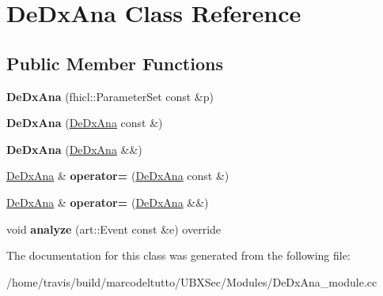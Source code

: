 \hypertarget{classDeDxAna}{\section{\-De\-Dx\-Ana \-Class \-Reference}
\label{classDeDxAna}
}
\subsection*{\-Public \-Member \-Functions}
\begin{DoxyCompactItemize}
\item 
\hypertarget{classDeDxAna_aafa017bdd99fff476da1a0fc5ea67722}{{\bfseries \-De\-Dx\-Ana} (fhicl\-::\-Parameter\-Set const \&p)}\label{classDeDxAna_aafa017bdd99fff476da1a0fc5ea67722}

\item 
\hypertarget{classDeDxAna_ae7e0a9f6e1db3755e4654823b34fcde4}{{\bfseries \-De\-Dx\-Ana} (\hyperlink{classDeDxAna}{\-De\-Dx\-Ana} const \&)}\label{classDeDxAna_ae7e0a9f6e1db3755e4654823b34fcde4}

\item 
\hypertarget{classDeDxAna_aad15dd4536f28285b7c09a592bf7754f}{{\bfseries \-De\-Dx\-Ana} (\hyperlink{classDeDxAna}{\-De\-Dx\-Ana} \&\&)}\label{classDeDxAna_aad15dd4536f28285b7c09a592bf7754f}

\item 
\hypertarget{classDeDxAna_a9742e2fc78c3b77f1bc7bf275913cf0a}{\hyperlink{classDeDxAna}{\-De\-Dx\-Ana} \& {\bfseries operator=} (\hyperlink{classDeDxAna}{\-De\-Dx\-Ana} const \&)}\label{classDeDxAna_a9742e2fc78c3b77f1bc7bf275913cf0a}

\item 
\hypertarget{classDeDxAna_acfafa21db320eff1ed8bf4acd021991c}{\hyperlink{classDeDxAna}{\-De\-Dx\-Ana} \& {\bfseries operator=} (\hyperlink{classDeDxAna}{\-De\-Dx\-Ana} \&\&)}\label{classDeDxAna_acfafa21db320eff1ed8bf4acd021991c}

\item 
\hypertarget{classDeDxAna_a997e03e16044d2e5c8603cc6578c43c3}{void {\bfseries analyze} (art\-::\-Event const \&e) override}\label{classDeDxAna_a997e03e16044d2e5c8603cc6578c43c3}

\end{DoxyCompactItemize}


\-The documentation for this class was generated from the following file\-:\begin{DoxyCompactItemize}
\item 
/home/travis/build/marcodeltutto/\-U\-B\-X\-Sec/\-Modules/\-De\-Dx\-Ana\-\_\-module.\-cc\end{DoxyCompactItemize}
